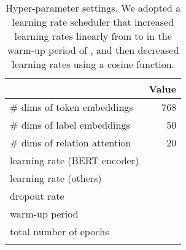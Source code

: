 \documentclass[11pt,a4paper]{article}
\begin{document}
\begin{table}[ht]
    \centering
    \begin{tabular}{lr}
      \Xhline{3\arrayrulewidth}    
         \multicolumn{1}{c}{Parameter} & \multicolumn{1}{c}{Value}  \\
         \hline
         \# dims of token embeddings  & 768 \\
         \# dims of label embeddings  & 50 \\
         \# dims of relation attention  & 20 \\
         \hline
         learning rate (BERT encoder) &  \\
         learning rate (others) &  \\
         dropout rate &  \\
         warm-up period &  \\
         total number of epochs &  \\
      \Xhline{3\arrayrulewidth}         
    \end{tabular}
    \caption{Hyper-parameter settings. We adopted a learning rate scheduler that increased learning rates linearly from  to  in the warm-up period of , and then decreased learning rates using a cosine function.}
    \label{tab:hyper}
\end{table}
\end{document}
